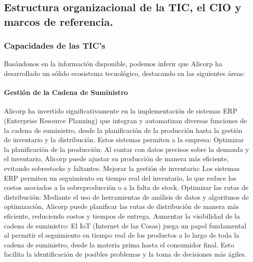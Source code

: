     

\subsection{Estructura organizacional de la TIC, el CIO y marcos de referencia.}
    \subsubsection{Capacidades de las TIC’s }
    Basándonos en la información disponible, podemos inferir que Alicorp ha desarrollado un sólido ecosistema tecnológico, destacando en las siguientes áreas: 

        \paragraph*{Gestión de la Cadena de Suministro} 
        Alicorp ha invertido significativamente en la implementación de sistemas ERP (Enterprise Resource Planning) que integran y automatizan diversas funciones de la cadena de suministro, desde la planificación de la producción hasta la gestión de inventario y la distribución. Estos sistemas permiten a la empresa: 
        Optimizar la planificación de la producción: Al contar con datos precisos sobre la demanda y el inventario, Alicorp puede ajustar su producción de manera más eficiente, evitando sobrestocks y faltantes. 
        Mejorar la gestión de inventario: Los sistemas ERP permiten un seguimiento en tiempo real del inventario, lo que reduce los costos asociados a la sobreproducción o a la falta de stock. 
        Optimizar las rutas de distribución: Mediante el uso de herramientas de análisis de datos y algoritmos de optimización, Alicorp puede planificar las rutas de distribución de manera más eficiente, reduciendo costos y tiempos de entrega. 
        Aumentar la visibilidad de la cadena de suministro: El IoT (Internet de las Cosas) juega un papel fundamental al permitir el seguimiento en tiempo real de los productos a lo largo de toda la cadena de suministro, desde la materia prima hasta el consumidor final. Esto facilita la identificación de posibles problemas y la toma de decisiones más ágiles. 

